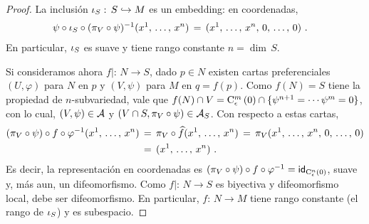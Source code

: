 \begin{proof}
	La inclusi\'{o}n $\inc[S]:\,S\hookrightarrow M$ es un embedding: en
	coordenadas,
	\begin{align*}
		\psi\circ\inc[S]\circ(\pi_V\circ\psi)^{-1}(\lista*{x}{n})
			& \,=\,(\lista*{x}{n},\,0,\,\dots,\,0)
		\text{ .}
	\end{align*}
	En particular, $\inc[S]$ es suave y tiene rango constante $n=\dim\,S$.

	Si consideramos ahora $f|:\,N\rightarrow S$, dado $p\in N$ existen
	cartas preferenciales $(U,\varphi)$ para $N$ en $p$ y $(V,\psi)$ para
	$M$ en $q=f(p)$. Como $f(N)=S$ tiene la propiedad de $n$-subvariedad,
	vale que
	\begin{math}
		f(N)\cap V=
			\cubo[m]{\epsilon}{0}\cap\{\psi^{n+1}=\cdots\psi^m=0\}
	\end{math}, con lo cual, $(V,\psi)\in\cal A$ y
	$(V\cap S,\pi_V\circ\psi)\in\cal A_S$. Con respecto a estas cartas,
	\begin{align*}
		(\pi_V\circ\psi)\circ f\circ\varphi^{-1}(\lista*{x}{n}) & \,=\,
			\pi_V\circ\encoordenadas{f}(\lista*{x}{n}) \,=\,
			\pi_V(\lista*{x}{n},\,0,\,\dots,\,0) \\
		& \,=\, (\lista*{x}{n})
		\text{ .}
	\end{align*}
	Es decir, la representaci\'{o}n en coordenadas es
	\begin{math}
		(\pi_V\circ\psi)\circ f\circ\varphi^{-1}=
			\id[{\cubo[n]{\epsilon}{0}}]
	\end{math}, suave y, m\'{a}s aun, un difeomorfismo. Como
	$f|:\,N\rightarrow S$ es biyectiva y difeomorfismo local, debe ser
	difeomorfismo. En particular, $f:\,N\rightarrow M$ tiene rango
	constante (el rango de $\inc[S]$) y es subespacio.
\end{proof}
